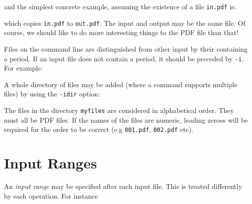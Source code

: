 \documentclass{book}
\begin{document}
\noindent{}

  \noindent and the simplest concrete example, assuming the existence of a file
\texttt{in.pdf} is:

\noindent{}

  \noindent which copies \texttt{in.pdf} to \texttt{out.pdf}. The input and
output may be the same file. Of course, we should like to do more interesting
things to the PDF file than that!


  Files on the command line are distinguished from other input by their
containing a period. If an input file does not contain a period, it should be
preceded by \verb!-i!. For example:

\noindent{}

\noindent A whole directory of files may be added (where a command supports multiple files) by using the \verb!-idir! option:

\noindent{}

  \noindent The files in the directory \verb!myfiles! are considered in alphabetical order. They must all be PDF files. If the names of the files are numeric, leading zeroes will be required for the order to be correct (e.g \verb!001.pdf!, \verb!002.pdf! etc).

  \section{Input Ranges}
  An   \textit{input range} may be specified
after each input file. This is treated differently by each operation. For
instance

\noindent{}
\end{document}
